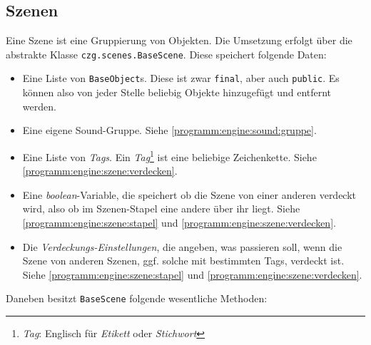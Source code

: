 \begin{sloppypar}
\subsection{Szenen} \label{programm:engine:szene}

Eine Szene ist eine Gruppierung von Objekten. Die Umsetzung erfolgt
über die abstrakte Klasse \texttt{czg.scenes.BaseScene}. Diese speichert
folgende Daten:

\begin{itemize}
	\item Eine Liste von \texttt{BaseObject}s. Diese ist zwar \texttt{final},
	      aber auch \texttt{public}. Es können also von jeder Stelle beliebig
	      Objekte hinzugefügt und entfernt werden.
	\item Eine eigene Sound-Gruppe. Siehe \ref{programm:engine:sound:gruppe}.
	\item Eine Liste von \textit{Tags}. Ein \textit{Tag}\footnote{\textit{Tag}: Englisch für \textit{Etikett} oder \textit{Stichwort}} ist eine beliebige Zeichenkette.
	      Siehe \ref{programm:engine:szene:verdecken}.
	\item Eine \textit{boolean}-Variable, die speichert ob die Szene von einer
		  anderen verdeckt wird, also ob im Szenen-Stapel eine andere über ihr liegt.
		  Siehe \ref{programm:engine:szene:stapel} und \ref{programm:engine:szene:verdecken}.
	\item Die \textit{Verdeckungs-Einstellungen}, die angeben, was passieren soll,
		  wenn die Szene von anderen Szenen, ggf. solche mit bestimmten Tags, verdeckt ist.
		  Siehe \ref{programm:engine:szene:stapel} und \ref{programm:engine:szene:verdecken}.
\end{itemize}

Daneben besitzt \texttt{BaseScene} folgende wesentliche Methoden:


\end{sloppypar}
